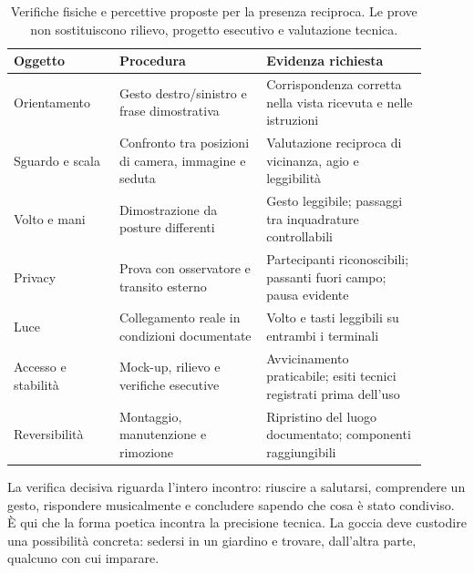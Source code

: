 \begin{table}[htbp]
\centering\small
\caption{Verifiche fisiche e percettive proposte per la presenza reciproca.
Le prove non sostituiscono rilievo, progetto esecutivo e valutazione tecnica.}
\label{tab:design-prove}
\begin{tabular}{P{0.23\linewidth}P{0.32\linewidth}P{0.35\linewidth}}
\hline
Oggetto & Procedura & Evidenza richiesta \\
\hline
Orientamento & Gesto destro/sinistro e frase dimostrativa & Corrispondenza corretta nella vista ricevuta e nelle istruzioni \\
Sguardo e scala & Confronto tra posizioni di camera, immagine e seduta & Valutazione reciproca di vicinanza, agio e leggibilità \\
Volto e mani & Dimostrazione da posture differenti & Gesto leggibile; passaggi tra inquadrature controllabili \\
Privacy & Prova con osservatore e transito esterno & Partecipanti riconoscibili; passanti fuori campo; pausa evidente \\
Luce & Collegamento reale in condizioni documentate & Volto e tasti leggibili su entrambi i terminali \\
Accesso e stabilità & Mock-up, rilievo e verifiche esecutive & Avvicinamento praticabile; esiti tecnici registrati prima dell'uso \\
Reversibilità & Montaggio, manutenzione e rimozione & Ripristino del luogo documentato; componenti raggiungibili \\
\hline
\end{tabular}
\end{table}

La verifica decisiva riguarda l'intero incontro: riuscire a salutarsi,
comprendere un gesto, rispondere musicalmente e concludere sapendo che
cosa è stato condiviso. È qui che la forma poetica incontra la precisione
tecnica. La goccia deve custodire una possibilità concreta: sedersi in
un giardino e trovare, dall'altra parte, qualcuno con cui imparare.
